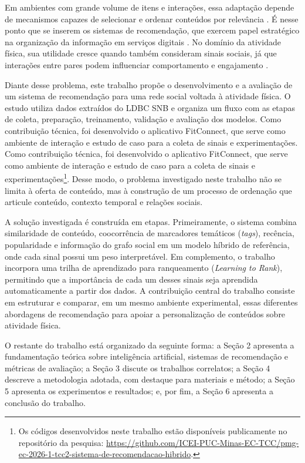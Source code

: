 \documentclass[a4paper,12pt]{article}
\begin{document}
Em ambientes com grande volume de itens e interações, essa adaptação depende de mecanismos capazes de selecionar e ordenar conteúdos por relevância \cite{10.1145/3285029}. É nesse ponto que se inserem os sistemas de recomendação, que exercem papel estratégico na organização da informação em serviços digitais \cite{GomezUribe2016Netflix}. No domínio da atividade física, sua utilidade cresce quando também consideram sinais sociais, já que interações entre pares podem influenciar comportamento e engajamento \cite{Franken2023}.

Diante desse problema, este trabalho propõe o desenvolvimento e a avaliação de um sistema de recomendação para uma rede social voltada à atividade física. O estudo utiliza dados extraídos do LDBC SNB \cite{Angles2020LDBCSNB} e organiza um fluxo com as etapas de coleta, preparação, treinamento, validação e avaliação dos modelos. Como contribuição técnica, foi desenvolvido o aplicativo FitConnect, que serve como ambiente de interação e estudo de caso para a coleta de sinais e experimentações.
Como contribuição técnica, foi desenvolvido o aplicativo FitConnect, que serve como ambiente de interação e estudo de caso para a coleta de sinais e experimentações\footnote{Os códigos desenvolvidos neste trabalho estão disponíveis publicamente no repositório da pesquisa: \url{https://github.com/ICEI-PUC-Minas-EC-TCC/pmg-ec-2026-1-tcc2-sistema-de-recomendacao-hibrido}.}. Desse modo, o problema investigado neste trabalho não se limita à oferta de conteúdo, mas à construção de um processo de ordenação que articule conteúdo, contexto temporal e relações sociais.

A solução investigada é construída em etapas. Primeiramente, o sistema combina similaridade de conteúdo, coocorrência de marcadores temáticos (\textit{tags}), recência, popularidade e informação do grafo social em um modelo híbrido de referência, onde cada sinal possui um peso interpretável. Em complemento, o trabalho incorpora uma trilha de aprendizado para ranqueamento (\textit{Learning to Rank}), permitindo que a importância de cada um desses sinais seja aprendida automaticamente a partir dos dados. A contribuição central do trabalho consiste em estruturar e comparar, em um mesmo ambiente experimental, essas diferentes abordagens de recomendação para apoiar a personalização de conteúdos sobre atividade física.

O restante do trabalho está organizado da seguinte forma: a Seção 2 apresenta a fundamentação teórica sobre inteligência artificial, sistemas de recomendação e métricas de avaliação; a Seção 3 discute os trabalhos correlatos; a Seção 4 descreve a metodologia adotada, com destaque para materiais e método; a Seção 5 apresenta os experimentos e resultados; e, por fim, a Seção 6 apresenta a conclusão do trabalho.
\end{document}
